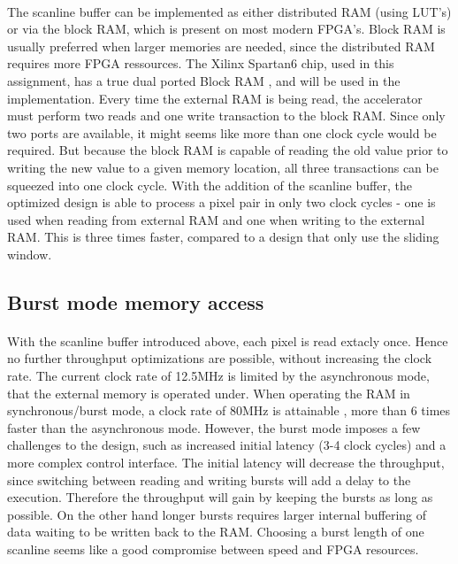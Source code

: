 \paragraph*{}
The scanline buffer can be implemented as either distributed RAM (using LUT's) or via the block RAM, which is present on most modern FPGA's. Block RAM is usually preferred when larger memories are needed, since the distributed RAM requires more FPGA ressources. The Xilinx Spartan6 chip, used in this assignment, has a true dual ported Block RAM \cite{Xilinx:UG383}, and will be used in the implementation.
Every time the external RAM is being read, the accelerator must perform two reads and one write transaction to the block RAM. Since only two ports are available, it might seems like more than one clock cycle would be required. But because the block RAM is capable of reading the old value prior to writing the new value to a given memory location, all three transactions can be squeezed into one clock cycle.
With the addition of the scanline buffer, the optimized design is able to process a pixel pair in only two clock cycles - one is used when reading from external RAM and one when writing to the external RAM. This is three times faster, compared to a design that only use the sliding window.

\subsection*{Burst mode memory access}
\label{sec:burstmode}
\paragraph*{}
With the scanline buffer introduced above, each pixel is read extacly once. Hence no further throughput optimizations are possible, without increasing the clock rate. The current clock rate of 12.5MHz is limited by the asynchronous mode, that the external memory is operated under. When operating the RAM in synchronous/burst mode, a clock rate of 80MHz is attainable \cite{Micron:CellularRAM}, more than 6 times faster than the asynchronous mode.
However, the burst mode imposes a few challenges to the design, such as increased initial latency (3-4 clock cycles) and a more complex control interface. The initial latency will decrease the throughput, since switching between reading and writing bursts will add a delay to the execution. Therefore the throughput will gain by keeping the bursts as long as possible. On the other hand longer bursts requires larger internal buffering of data waiting to be written back to the RAM. Choosing a burst length of one scanline seems like a good compromise between speed and FPGA resources.

